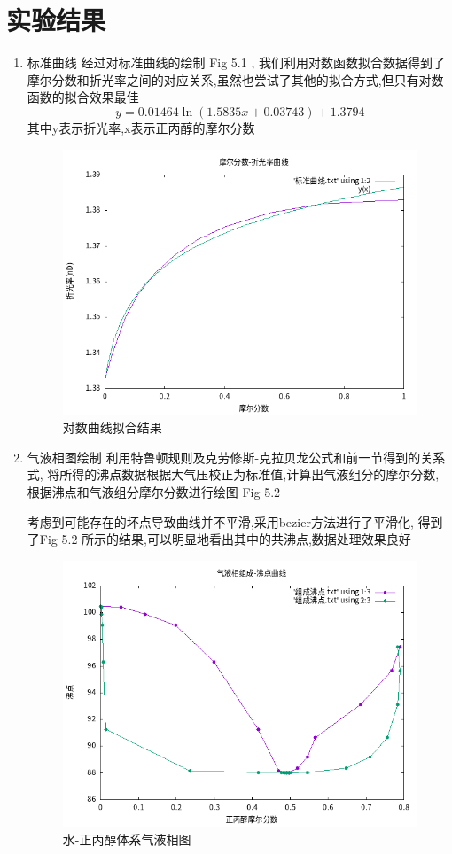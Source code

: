 \documentclass[11pt]{report}
\begin{document}
\section{实验结果}
\label{sec:org4429876}
\begin{enumerate}
\item 标准曲线
\label{sec:orgad5568a}
经过对标准曲线的绘制 Fig 5.1 , 我们利用对数函数拟合数据得到了
摩尔分数和折光率之间的对应关系,虽然也尝试了其他的拟合方式,但只有对数函数的拟合效果最佳
\[
y=0.01464\ln(1.5835x+0.03743)+1.3794
\]
其中y表示折光率,x表示正丙醇的摩尔分数
\begin{figure}[htbp]
\centering
\includegraphics[width=.9\linewidth]{../data/标准曲线-对数曲线拟合.png}
\caption{对数曲线拟合结果}
\end{figure}
\item 气液相图绘制
\label{sec:orgc9b35cf}
利用特鲁顿规则及克劳修斯-克拉贝龙公式和前一节得到的关系式,
将所得的沸点数据根据大气压校正为标准值,计算出气液组分的摩尔分数,
根据沸点和气液组分摩尔分数进行绘图 Fig 5.2

 考虑到可能存在的坏点导致曲线并不平滑,采用bezier方法进行了平滑化,
得到了Fig 5.2 所示的结果,可以明显地看出其中的共沸点,数据处理效果良好

\begin{figure}[htbp]
\centering
\includegraphics[width=.9\linewidth]{../data/气液相组成-沸点曲线.png}
\caption{水-正丙醇体系气液相图}
\end{figure}



\end{enumerate}
\end{document}
